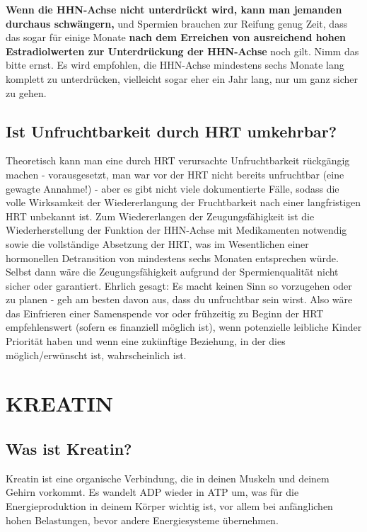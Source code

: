 \documentclass{article}
\begin{document}
\textbf{Wenn die HHN-Achse nicht unterdrückt wird, kann man jemanden durchaus schwängern,} und Spermien brauchen zur Reifung genug Zeit, dass das sogar für einige Monate \textbf{nach dem Erreichen von ausreichend hohen Estradiolwerten zur Unterdrückung der HHN-Achse} noch gilt. Nimm das bitte ernst. Es wird empfohlen, die HHN-Achse mindestens sechs Monate lang komplett zu unterdrücken, vielleicht sogar eher ein Jahr lang, nur um ganz sicher zu gehen.

\subsection{Ist Unfruchtbarkeit durch HRT umkehrbar?}\label{11-43}

Theoretisch kann man eine durch HRT verursachte Unfruchtbarkeit rückgängig machen - vorausgesetzt, man war vor der HRT nicht bereits unfruchtbar (eine gewagte Annahme!) -  aber es gibt nicht viele dokumentierte Fälle, sodass die volle Wirksamkeit der Wiedererlangung der Fruchtbarkeit nach einer langfristigen HRT unbekannt ist. Zum Wiedererlangen der Zeugungsfähigkeit ist die Wiederherstellung der Funktion der HHN-Achse mit Medikamenten notwendig sowie die vollständige Absetzung der HRT, was im Wesentlichen einer hormonellen Detransition von mindestens sechs Monaten entsprechen würde. Selbst dann wäre die Zeugungsfähigkeit aufgrund der Spermienqualität nicht sicher oder garantiert. Ehrlich gesagt: Es macht keinen Sinn so vorzugehen oder zu planen - geh am besten davon aus, dass du unfruchtbar sein wirst. Also wäre das Einfrieren einer Samenspende vor oder frühzeitig zu Beginn der HRT empfehlenswert (sofern es finanziell möglich ist), wenn potenzielle leibliche Kinder Priorität haben und wenn eine zukünftige Beziehung, in der dies möglich/erwünscht ist, wahrscheinlich ist.



\section{KREATIN}

\subsection{Was ist Kreatin?}

Kreatin ist eine organische Verbindung, die in deinen Muskeln und deinem Gehirn vorkommt. Es wandelt ADP wieder in ATP um, was für die Energieproduktion in deinem Körper wichtig ist, vor allem bei anfänglichen hohen Belastungen, bevor andere Energiesysteme übernehmen.
\end{document}
